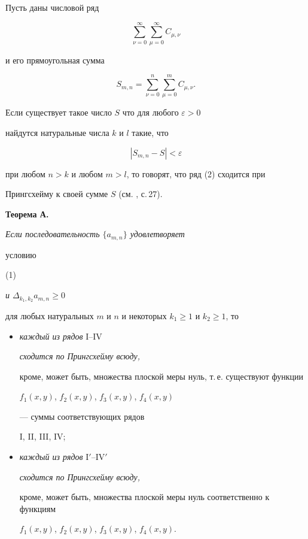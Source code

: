  


Пусть даны числовой ряд 


\begin{equation} 


\sum^\infty_{\nu=0}\sum^\infty_{\mu=0}C_{\mu,\nu}\tag{2} 


\end{equation} 


и его прямоугольная сумма 


$$ 


S_{m,n}=\sum^n_{\nu=0}\sum^m_{\mu=0}C_{\mu,\nu}. 


$$ 


 


Если существует такое число $S$ что для любого $\varepsilon>0$ 


найдутся натуральные числа $k$ и $l$ такие, что 


$$ 


|S_{m,n}-S|<\varepsilon 


$$ 


при любом $n>k$ и любом $m>l$, то говорят, что ряд (2) сходится при 


Прингсхейму к своей сумме $S$ (см. \cite{Whi}, с.\,27). 


\medskip 


 


{\bf Теорема А.} {\it Если последовательность $\{a_{m,n}\}$ удовлетворяет 


условию} (1) {\it и $\Delta_{k_1,k_2}a_{m,n}\ge 0$ 


для любых натуральных $m$ и $n$ и некоторых $k_1\ge 1$ и $k_2\ge 1$, то} 


\begin{itemize} 


\item[а)] {\it каждый из рядов} I--IV {\it сходится по Прингсхейму всюду, 


кроме, может быть, множества плоской меры нуль, т.\,е. существуют функции 


$f_1(x,y)$, $f_2(x,y)$, $f_3(x,y)$, $f_4(x,y)$ 


--- суммы соответствующих рядов} I, II, III, IV; 


\item[б)] {\it каждый из рядов} I$'$--IV$'$ {\it сходится по Прингсхейму всюду,


кроме, может быть, множества плоской меры нуль соответственно к функциям} 


$f_1(x,y)$, $f_2(x,y)$, $f_3(x,y)$, $f_4(x,y)$.


\end{itemize} 



